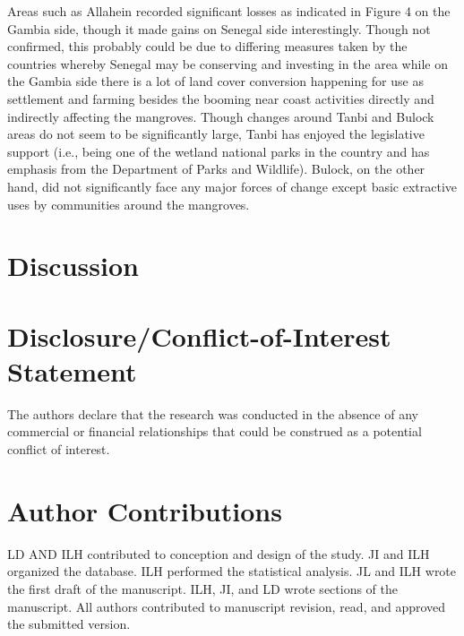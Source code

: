 \documentclass[utf8]{frontiersSCNS}
\begin{document}
Areas such as Allahein recorded significant losses as indicated in
Figure 4 on the Gambia side, though it made gains on Senegal side
interestingly. Though not confirmed, this probably could be due to
differing measures taken by the countries whereby Senegal may be
conserving and investing in the area while on the Gambia side there is a
lot of land cover conversion happening for use as settlement and farming
besides the booming near coast activities directly and indirectly
affecting the mangroves. Though changes around Tanbi and Bulock areas do
not seem to be significantly large, Tanbi has enjoyed the legislative
support (i.e., being one of the wetland national parks in the country
and has emphasis from the Department of Parks and Wildlife). Bulock, on
the other hand, did not significantly face any major forces of change
except basic extractive uses by communities around the mangroves.

\hypertarget{discussion}{%
\section*{Discussion}\label{discussion}}

\hypertarget{disclosureconflict-of-interest-statement}{%
\section*{Disclosure/Conflict-of-Interest
Statement}\label{disclosureconflict-of-interest-statement}}

The authors declare that the research was conducted in the absence of
any commercial or financial relationships that could be construed as a
potential conflict of interest.

\hypertarget{author-contributions}{%
\section*{Author Contributions}\label{author-contributions}}

LD AND ILH contributed to conception and design of the study. JI and ILH
organized the database. ILH performed the statistical analysis. JL and
ILH wrote the first draft of the manuscript. ILH, JI, and LD wrote
sections of the manuscript. All authors contributed to manuscript
revision, read, and approved the submitted version.
\end{document}
